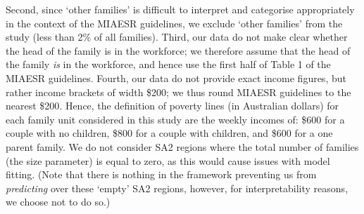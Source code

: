 \documentclass[nojss]{jss}
\begin{document}
\begin{appendix}
Second, since `other families' is difficult to interpret and categorise appropriately in the context of the MIAESR guidelines, we exclude `other families' from the study (less than 2\% of all families). 
Third, our data do not make clear whether the head of the family is in the workforce; we therefore assume that the head of the family \textit{is} in the workforce, and hence use the first half of Table 1 of the MIAESR guidelines.
Fourth, our data do not provide exact income figures, but rather income brackets of width \$200; we thus round MIAESR guidelines to the nearest \$200. 
Hence, the definition of poverty lines (in Australian dollars) for each family unit considered in this study are the weekly incomes of: \$600 for a couple with no children, \$800 for a couple with children, and \$600 for a one parent family. 
We do not consider SA2 regions where the total number of families (the size parameter) is equal to zero, as this would cause issues with model fitting.
(Note that there is nothing in the framework preventing us from \textit{predicting} over these `empty' SA2 regions, however, for interpretability reasons, we choose not to do so.)



\end{appendix}
\end{document}
